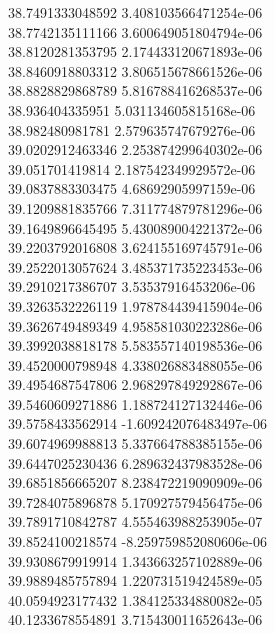{38.7491333048592 3.408103566471254e-06 \\
38.7742135111166 3.600649051804794e-06 \\
38.8120281353795 2.174433120671893e-06 \\
38.8460918803312 3.806515678661526e-06 \\
38.8828829868789 5.816788416268537e-06 \\
38.936404335951 5.031134605815168e-06 \\
38.982480981781 2.579635747679276e-06 \\
39.0202912463346 2.253874299640302e-06 \\
39.051701419814 2.187542349929572e-06 \\
39.0837883303475 4.68692905997159e-06 \\
39.1209881835766 7.311774879781296e-06 \\
39.1649896645495 5.430089004221372e-06 \\
39.2203792016808 3.624155169745791e-06 \\
39.2522013057624 3.485371735223453e-06 \\
39.2910217386707 3.53537916453206e-06 \\
39.3263532226119 1.978784439415904e-06 \\
39.3626749489349 4.958581030223286e-06 \\
39.3992038818178 5.583557140198536e-06 \\
39.4520000798948 4.338026883488055e-06 \\
39.4954687547806 2.968297849292867e-06 \\
39.5460609271886 1.188724127132446e-06 \\
39.5758433562914 -1.609242076483497e-06 \\
39.6074969988813 5.337664788385155e-06 \\
39.6447025230436 6.289632437983528e-06 \\
39.6851856665207 8.238472219090909e-06 \\
39.7284075896878 5.170927579456475e-06 \\
39.7891710842787 4.555463988253905e-07 \\
39.8524100218574 -8.259759852080606e-06 \\
39.9308679919914 1.343663257102889e-06 \\
39.9889485757894 1.220731519424589e-05 \\
40.0594923177432 1.384125334880082e-05 \\
40.1233678554891 3.715430011652643e-06 \\
}
